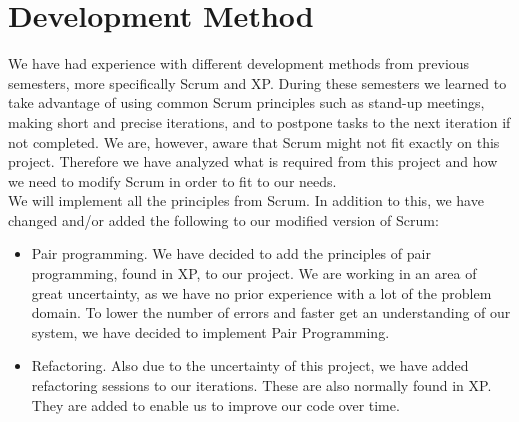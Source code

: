 \section{Development Method}
We have had experience with different development methods from previous semesters, more specifically Scrum and XP.
During these semesters we learned to take advantage of using common Scrum principles such as stand-up meetings, making short and precise iterations, and to postpone tasks to the next iteration if not completed.
We are, however, aware that Scrum might not fit exactly on this project.
Therefore we have analyzed what is required from this project and how we need to modify Scrum in order to fit to our needs. \\

We will implement all the principles from Scrum. In addition to this, we have changed and/or added the following to our modified version of Scrum:
\begin{itemize}
	\item Pair programming. We have decided to add the principles of pair programming, found in XP, to our project. We are working in an area of great uncertainty, as we have no prior experience with a lot of the problem domain. To lower the number of errors and faster get an understanding of our system, we have decided to implement Pair Programming.
	\item Refactoring. Also due to the uncertainty of this project, we have added refactoring sessions to our iterations. These are also normally found in XP. They are added to enable us to improve our code over time.
\end{itemize}



